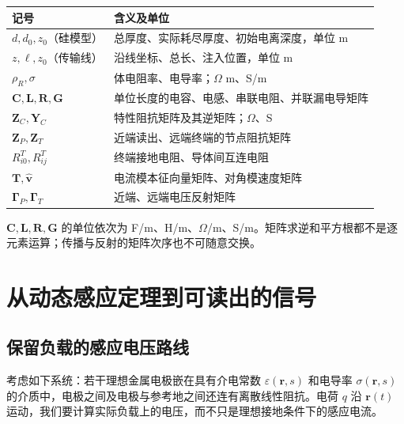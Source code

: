\documentclass[
  11pt,
  a4paper,
  oneside,
  openany]{report}
\numberwithin{equation}{chapter}
\begin{document}
\begin{longtable}[]{@{}
  >{\raggedright\arraybackslash}p{}
  >{\raggedright\arraybackslash}p{}@{}}
\toprule\noalign{}
\begin{minipage}[b]{\linewidth}\raggedright
记号
\end{minipage} & \begin{minipage}[b]{\linewidth}\raggedright
含义及单位
\end{minipage} \\
\midrule\noalign{}
\endhead
\bottomrule\noalign{}
\endlastfoot
\(d,d_0,z_0\)（硅模型） & 总厚度、实际耗尽厚度、初始电离深度，单位 m \\
\(z,\ell,z_0\)（传输线） & 沿线坐标、总长、注入位置，单位 m \\
\(\rho_R,\sigma\) & 体电阻率、电导率；\(\Omega\) m、S/m \\
\(\mathbf C,\mathbf L,\mathbf R,\mathbf G\) &
单位长度的电容、电感、串联电阻、并联漏电导矩阵 \\
\(\mathbf Z_C,\mathbf Y_C\) & 特性阻抗矩阵及其逆矩阵；\(\Omega\)、S \\
\(\mathbf Z_P,\mathbf Z_T\) & 近端读出、远端终端的节点阻抗矩阵 \\
\(R^T_{i0},R^T_{ij}\) & 终端接地电阻、导体间互连电阻 \\
\(\mathbf T,\widehat{\mathbf v}\) &
电流模本征向量矩阵、对角模速度矩阵 \\
\(\boldsymbol\Gamma_P,\boldsymbol\Gamma_T\) & 近端、远端电压反射矩阵 \\
\end{longtable}

\(\mathbf C,\mathbf L,\mathbf R,\mathbf G\) 的单位依次为
F/m、H/m、\(\Omega\)/m、S/m。矩阵求逆和平方根都不是逐元素运算；传播与反射的矩阵次序也不可随意交换。

\clearpage
\tableofcontents
\clearpage
{}

\chapter{从动态感应定理到可读出的信号}\label{chap-theorems}

\section{保留负载的感应电压路线}\label{sec-voltage-route}

考虑如下系统：若干理想金属电极嵌在具有介电常数
\(\varepsilon(\mathbf r,s)\) 和电导率 \(\sigma(\mathbf r,s)\)
的介质中，电极之间及电极与参考地之间还连有离散线性阻抗。电荷 \(q\) 沿
\(\mathbf r(t)\)
运动，我们要计算实际负载上的电压，而不只是理想接地条件下的感应电流。
\end{document}
